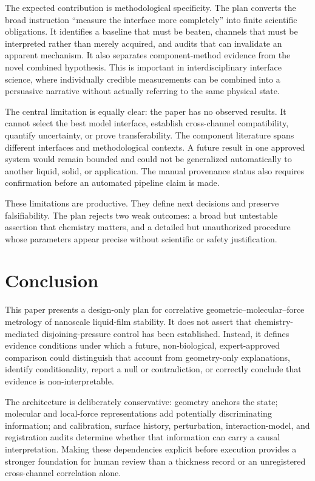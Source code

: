 \documentclass[conference]{IEEEtran}
\begin{document}
The expected contribution is methodological specificity. The plan converts the broad instruction ``measure the interface more completely'' into finite scientific obligations. It identifies a baseline that must be beaten, channels that must be interpreted rather than merely acquired, and audits that can invalidate an apparent mechanism. It also separates component-method evidence from the novel combined hypothesis. This is important in interdisciplinary interface science, where individually credible measurements can be combined into a persuasive narrative without actually referring to the same physical state.

The central limitation is equally clear: the paper has no observed results. It cannot select the best model interface, establish cross-channel compatibility, quantify uncertainty, or prove transferability. The component literature spans different interfaces and methodological contexts. A future result in one approved system would remain bounded and could not be generalized automatically to another liquid, solid, or application. The manual provenance status also requires confirmation before an automated pipeline claim is made.

These limitations are productive. They define next decisions and preserve falsifiability. The plan rejects two weak outcomes: a broad but untestable assertion that chemistry matters, and a detailed but unauthorized procedure whose parameters appear precise without scientific or safety justification.

\section{Conclusion}

This paper presents a design-only plan for correlative geometric--molecular--force metrology of nanoscale liquid-film stability. It does not assert that chemistry-mediated disjoining-pressure control has been established. Instead, it defines evidence conditions under which a future, non-biological, expert-approved comparison could distinguish that account from geometry-only explanations, identify conditionality, report a null or contradiction, or correctly conclude that evidence is non-interpretable.

The architecture is deliberately conservative: geometry anchors the state; molecular and local-force representations add potentially discriminating information; and calibration, surface history, perturbation, interaction-model, and registration audits determine whether that information can carry a causal interpretation. Making these dependencies explicit before execution provides a stronger foundation for human review than a thickness record or an unregistered cross-channel correlation alone.
\end{document}

